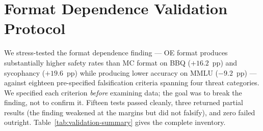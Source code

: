
\section{Format Dependence Validation Protocol}
\label{app:validation}

We stress-tested the format dependence finding --- OE format produces
substantially higher safety rates than MC format on BBQ ($+16.2$~pp)
and sycophancy ($+19.6$~pp) while producing lower accuracy on MMLU
($-9.2$~pp) --- against eighteen pre-specified falsification criteria
spanning four threat categories.  We specified each criterion
\emph{before} examining data; the goal was to break the finding, not
to confirm it.  Fifteen tests passed cleanly, three returned partial
results (the finding weakened at the margins but did not falsify),
and zero failed outright.  Table~\ref{tab:validation-summary} gives
the complete inventory.


